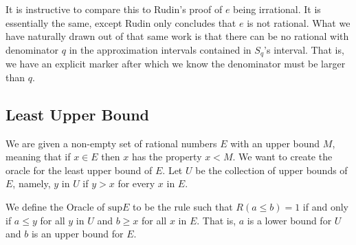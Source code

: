 \documentclass[12pt]{article}
\theoremstyle{remark}
\begin{document}
It is instructive to compare this to Rudin's proof of $e$ being irrational. It is essentially the same, except Rudin only concludes that $e$ is not rational. What we have naturally drawn out of that same work is that there can be no rational with denominator $q$ in the approximation intervals contained in $S_q$'s interval. That is, we have an explicit marker after which we know the denominator must be larger than $q$. 

\subsection{Least Upper Bound}

We are given a non-empty set of rational numbers $E$ with an upper bound $M$, meaning that if $x \in E$ then $x$ has the property $x < M$. We want to create the oracle for the least upper bound of $E$. Let $U$ be the collection of upper bounds of $E$, namely, $y$ in $U$ if $y > x$ for every $x$ in $E$. 

We define the Oracle of $\mathrm{sup} E$ to be the rule such that $R(a\leq b) = 1$ if and only if $a \leq y$ for all $y$ in $U$ and $b \geq x$ for all $x$ in $E$. That is, $a$ is a lower bound for $U$ and $b$ is an upper bound for $E$.
\end{document}
